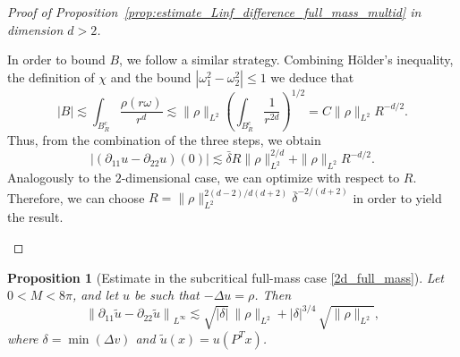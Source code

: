 \documentclass[11pt,a4paper]{article}
\numberwithin{equation}{section}
\theoremstyle{plain}
\newtheorem{proposition}[theorem]{Proposition}
\theoremstyle{remark}
\newcommand {\f}{\frac}
\newcommand{\step}[1][]{%
  \if\relax\detokenize{#1}\relax
    \def\thisstep{.}%
  \else
    \def\thisstep{: \protect #1.}%
  \fi
  \item}
\begin{document}
\begin{proof}[Proof of Proposition~\ref{prop:estimate_Linf_difference_full_mass_multid} in dimension $d>2$]
\begin{enumeratesteps}
\step[An estimate for $B$]
In order to bound $B$, we follow a similar strategy. Combining H\"older's inequality, the definition of $\chi$ and the bound $|\omega_{1}^{2}-\omega_{2}^2|\leq 1$ we deduce that
$$
    |B|\lesssim \int_{B_R^c} \frac{\rho(r\omega)}{r^d} \lesssim \|\rho\|_{L^{2}} \left( \int_{B_R^c} \f{1}{r^{2d}} \right)^{1/2} = C \|\rho\|_{L^{2}} R^{-d/2}.
$$
Thus, from the combination of the three steps, we obtain
$$
    |(\partial_{11}u - \partial_{22}u)(0)|\lesssim \bar\delta R\|\rho\|_{L^2}^{2/d} + \|\rho\|_{L^2} R^{-d/2}.
$$
Analogously to the $2$-dimensional case, we can optimize with respect to $R$. Therefore, we can choose $R= \|\rho\|_{L^2}^{2(d-2)/d(d+2)}\bar\delta^{-2/(d+2)}$ in order to yield the result. \qedhere
\end{enumeratesteps}
\end{proof}











\iffalse

\begin{proposition}[Estimate in the subcritical full-mass case \ref{2d_full_mass}]
\label{prop:estimate_Linf_difference_full_mass}
Let $0<M<8\pi$, and let $u$ be such that $-\Delta u=\rho$.  Then 
\[
\left\|\partial_{11}\tilde{u}  - \partial_{22}\tilde{u}\right\|_{L^\infty}
 \lesssim 
\sqrt{|\delta|}\,\|\rho\|_{L^2}
 + 
|\delta|^{3/4}\,\sqrt{\|\rho\|_{L^2}},
\]
where $\delta = \min(\Delta v)$ and $\tilde{u}(x) = u(P^Tx)$.
\end{proposition}
\end{document}

